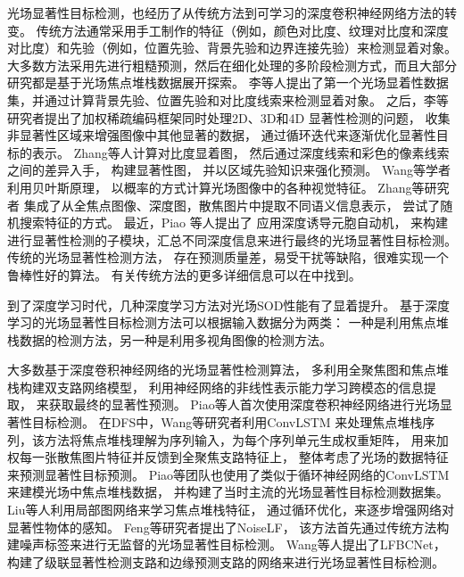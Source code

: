 


光场显著性目标检测，也经历了从传统方法到可学习的深度卷积神经网络方法的转变。
传统方法通常采用手工制作的特征（例如，颜色对比度、纹理对比度和深度对比度）和先验（例如，位置先验、背景先验和边界连接先验）来检测显着对象。 
大多数方法采用先进行粗糙预测，然后在细化处理的多阶段检测方式，而且大部分研究都是基于光场焦点堆栈数据展开探索。
%
%
李等人提出了第一个光场显着性数据集，并通过计算背景先验、位置先验和对比度线索来检测显着对象。
之后，李等研究者提出了加权稀疏编码框架同时处理2D、3D和4D 显著性检测的问题，
收集非显著性区域来增强图像中其他显著的数据，
通过循环迭代来逐渐优化显著性目标的表示。
Zhang等人计算对比度显着图，
然后通过深度线索和彩色的像素线索之间的差异入手，
构建显著性图，
并以区域先验知识来强化预测。
Wang等学者利用贝叶斯原理，
以概率的方式计算光场图像中的各种视觉特征。
Zhang等研究者
集成了从全焦点图像、深度图，散焦图片中提取不同语义信息表示，
尝试了随机搜索特征的方式。
最近，Piao 等人提出了
应用深度诱导元胞自动机，
来构建进行显著性检测的子模块，汇总不同深度信息来进行最终的光场显著性目标检测。
传统的光场显著性检测方法，
存在预测质量差，易受干扰等缺陷，很难实现一个鲁棒性好的算法。
有关传统方法的更多详细信息可以在中找到。





到了深度学习时代，几种深度学习方法对光场SOD性能有了显着提升。 
基于深度学习的光场显著性目标检测方法可以根据输入数据分为两类：
一种是利用焦点堆栈数据的检测方法，另一种是利用多视角图像的检测方法。



大多数基于深度卷积神经网络的光场显著性检测算法，
多利用全聚焦图和焦点堆栈构建双支路网络模型，
利用神经网络的非线性表示能力学习跨模态的信息提取，
来获取最终的显著性预测。
Piao等人首次使用深度卷积神经网络进行光场显著性目标检测。
在DFS中，Wang等研究者利用ConvLSTM
来处理焦点堆栈序列，该方法将焦点堆栈理解为序列输入，为每个序列单元生成权重矩阵，
用来加权每一张散焦图片特征并反馈到全聚焦支路特征上，
整体考虑了光场的数据特征来预测显著性目标预测。
Piao等团队也使用了类似于循环神经网络的ConvLSTM来建模光场中焦点堆栈数据，
并构建了当时主流的光场显著性目标检测数据集。
Liu等人利用局部图网络来学习焦点堆栈特征，
通过循环优化，来逐步增强网络对显著性物体的感知。
Feng等研究者提出了NoiseLF，
该方法首先通过传统方法构建噪声标签来进行无监督的光场显著性目标检测。
Wang等人提出了LFBCNet，
构建了级联显著性检测支路和边缘预测支路的网络来进行光场显著性目标检测。




